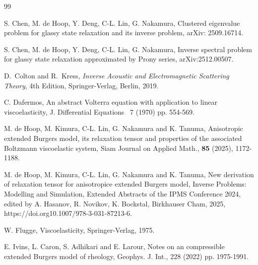 \documentclass[a4paper,12pt]{article}
\newtheorem{a priori condition}[Th]{A priori condition}
\begin{document}
\begin{thebibliography}{99}

S. Chen, M. de Hoop, Y. Deng, C-L. Lin, G. Nakamura, 
Clustered eigenvalue problem for glassy state relaxation and its inverse problem, arXiv: 2509.16714.

S. Chen, M. de Hoop, Y. Deng, C-L. Lin, G. Nakamura, Inverse spectral problem for glassy state relaxation approximated by Prony series, arXiv:2512.00507.


 {D.~Colton and R.~Kress}, {\it Inverse
Acoustic and Electromagnetic Scattering Theory}, 4th Edition,
Springer-Verlag, Berlin, 2019.

C. Dafermos, An abstract Volterra equation with application to linear viscoelasticity, J. Differential Equations \, 7 (1970) pp. 554-569.

M. de Hoop, M. Kimura, C-L. Lin, G. Nakamura and K. Tanuma, Anisotropic extended Burgers model, its relaxation tensor and properties of the associated Boltzmann viscoelastic system,  Siam Journal on Applied Math., {\bf 85} (2025), 1172-1188.

M. de Hoop, M. Kimura, C-L. Lin, G. Nakamura and K. Tanuma, New derivation of relaxation tensor for anisotropice extended Burgers model, Inverse Problems: Modelling and Simulation, Extended Abstracts of the IPMS Conference 2024, edited by A. Hasanov, R. Novikov, K. Bockstal, Birkhauser Cham, 2025, https://doi.org10.1007/978-3-031-87213-6.





W. Flugge, Viscoelasticity, Springer-Verlag, 1975.

E. Ivins, L. Caron, S. Adhikari and E. Larour, Notes on an compressible extended Burgers model of rheology, Geophys. J. Int., 228 (2022) pp. 1975-1991.


\end{thebibliography}
\end{document}
